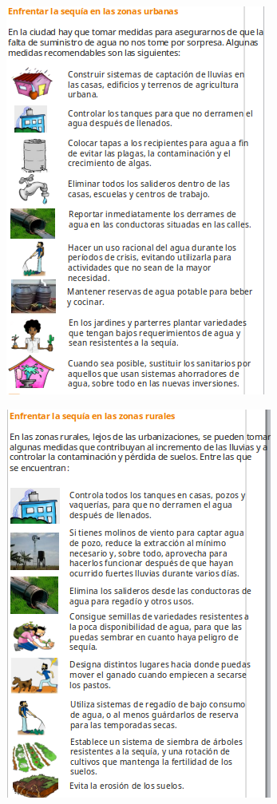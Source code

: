 \documentclass[12pt]{article}
\begin{document}
	\begin{figure}[H]
		\centering
		\includegraphics[width=0.8\linewidth]{./Report/images/6}
	\end{figure}
	\begin{figure}[H]
		\centering
		\includegraphics[width=0.8\linewidth]{./Report/images/7}
	\end{figure}
	
\end{document}

